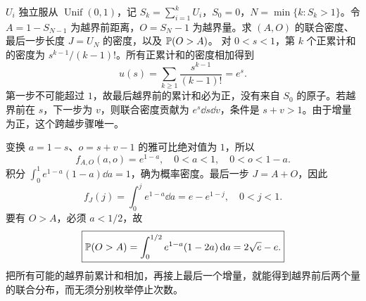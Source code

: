 $U_i$ 独立服从 $\operatorname{Unif}(0,1)$，记 $S_k=\sum_{i=1}^kU_i$，$S_0=0$，$N=\min\{k:S_k>1\}$。令 $A=1-S_{N-1}$ 为越界前距离，$O=S_N-1$ 为越界量。求 $(A,O)$ 的联合密度、最后一步长度 $J=U_N$ 的密度，以及 $\mathbb{P}(O>A)$。
\solution 对 $0<s<1$，第 $k$ 个正累计和的密度为 $s^{k-1}/(k-1)!$。所有正累计和的密度相加得到
\[
u(s)=\sum_{k\ge1}\frac{s^{k-1}}{(k-1)!}=e^s.
\]
第一步不可能超过 $1$，故最后越界前的累计和必为正，没有来自 $S_0$ 的原子。若越界前在 $s$，下一步为 $v$，则联合密度贡献为 $e^s\dd s\dd v$，条件是 $s+v>1$。由于增量为正，这个跨越步骤唯一。

变换 $a=1-s$、$o=s+v-1$ 的雅可比绝对值为 $1$，所以
\[
\boxed{f_{A,O}(a,o)=e^{1-a},\quad 0<a<1,\quad0<o<1-a.}
\]
积分 $\int_0^1e^{1-a}(1-a)\dd a=1$，确为概率密度。最后一步 $J=A+O$，因此
\[
\boxed{f_J(j)=\int_0^je^{1-a}\dd a=e-e^{1-j},\quad0<j<1.}
\]
要有 $O>A$，必须 $a<1/2$，故
\[
\boxed{\mathbb{P}(O>A)=\int_0^{1/2}e^{1-a}(1-2a)\,\mathrm{d} a
=2\sqrt e-e.}
\]
\insight 把所有可能的越界前累计和相加，再接上最后一个增量，就能得到越界前后两个量的联合分布，而无须分别枚举停止次数。
